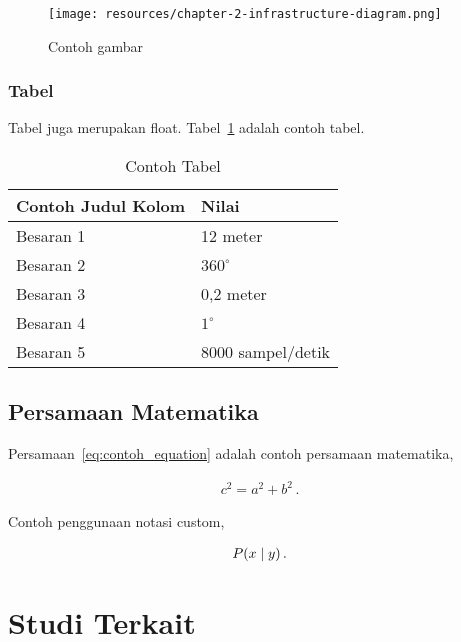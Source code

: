     \begin{figure}[h]
        \centering
        \texttt{[image: resources/chapter-2-infrastructure-diagram.png]}
        \caption{Contoh gambar}
        \label{fig:contoh_gambar}
    \end{figure}

    \subsubsection{Tabel}

    Tabel juga merupakan float. Tabel~\ref{table:contoh_tabel} adalah contoh tabel.

    \begin{table}[htbp]
        \small
        \centering
        \caption{Contoh Tabel}
        \label{table:contoh_tabel}
        \begin{tabular}{ll}
            \toprule
            \multicolumn{1}{l}{\textbf{Contoh Judul Kolom}} & \multicolumn{1}{l}{\textbf{Nilai}}\\
            \midrule
            Besaran 1 & 12 meter          \\
            Besaran 2 & $360^\circ$       \\
            Besaran 3 & 0,2 meter         \\
            Besaran 4 & $1^\circ$         \\
            Besaran 5 & 8000 sampel/detik \\
            \bottomrule
        \end{tabular}
    \end{table}

    \subsection{Persamaan Matematika}

    \blindtext Persamaan~\eqref{eq:contoh_equation} adalah contoh persamaan matematika,

    \begin{align}
        c^2 = a^2 + b^2\,.
    \label{eq:contoh_equation}
    \end{align}
    
    Contoh penggunaan notasi custom,
    
    \begin{align}
        P(x \mid y)\,.
    \label{eq:contoh_equation_custom}
    \end{align}

\section{Studi Terkait}
\blindtext
